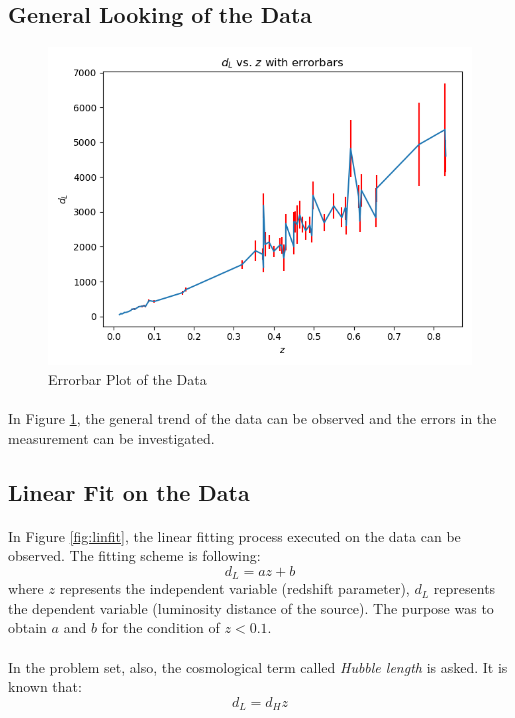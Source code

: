 \documentclass[letterpaper,12pt]{article}
\begin{document}
\subsection{General Looking of the Data}
\begin{figure}[H]
    \centerline{\includegraphics[width=\linewidth]{figures/errorplot.png}}
    \caption{Errorbar Plot of the Data}
    \label{fig:errorplot}
    \end{figure}
\paragraph{}In Figure \ref{fig:errorplot}, the general trend of the data can be observed and the errors in the measurement can be investigated.

\subsection{Linear Fit on the Data}
\paragraph{} In Figure \ref{fig:linfit}, the linear fitting process executed on the data can be observed. The fitting scheme is following:
\begin{equation*}
    d_L = az+b
\end{equation*}
where $z$ represents the independent variable  (redshift parameter), $d_L$ represents the dependent variable (luminosity distance of the source). The purpose was to obtain $a$ and $b$ for the condition of $z<0.1$.
\paragraph{} In the problem set, also, the cosmological term called \textit{Hubble length} is asked. It is known that:
\begin{equation*}
    d_L = d_Hz
\end{equation*}
\end{document}
